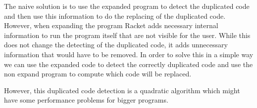 The naive solution is to use the expanded program to detect the duplicated
 code and then use this information to do the replacing of the duplicated code.
However, when expanding the program Racket adds necessary internal information to
run the program itself that are not visible for the user.
While this does not change the detecting of the duplicated code, it adds unnecessary information
that would have to be removed.
In order to solve this in a simple way we can use the expanded code to detect
the correctly duplicated code and use the non expand program
to compute which code will be replaced.

However, this duplicated code detection is a quadratic algorithm which might
have some performance problems for bigger programs.

